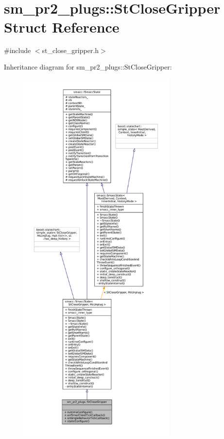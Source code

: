 \hypertarget{structsm__pr2__plugs_1_1StCloseGripper}{}\section{sm\+\_\+pr2\+\_\+plugs\+:\+:St\+Close\+Gripper Struct Reference}
\label{structsm__pr2__plugs_1_1StCloseGripper}


{\ttfamily \#include $<$st\+\_\+close\+\_\+gripper.\+h$>$}



Inheritance diagram for sm\+\_\+pr2\+\_\+plugs\+:\+:St\+Close\+Gripper\+:
\nopagebreak
\begin{figure}[H]
\begin{center}
\leavevmode
\includegraphics[height=550pt]{structsm__pr2__plugs_1_1StCloseGripper__inherit__graph}
\end{center}
\end{figure}


